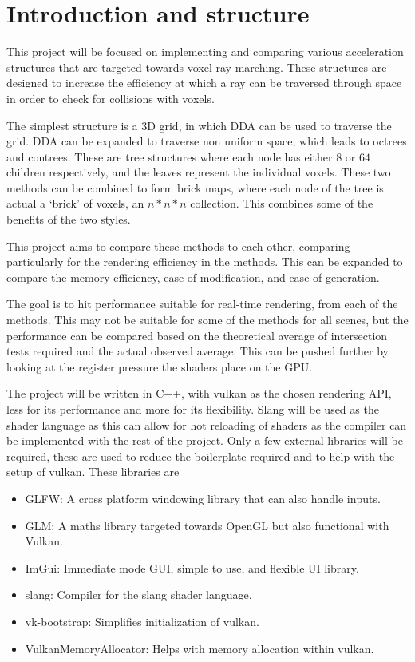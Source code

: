 \section*{Introduction and structure}

This project will be focused on implementing and comparing various
acceleration structures that are targeted towards voxel ray marching.
These structures are designed to increase the efficiency at which a
ray can be traversed through space in order to check for collisions with
voxels.

The simplest structure is a 3D grid, in which DDA can be used to
traverse the grid. DDA can be expanded to traverse non uniform space,
which leads to octrees and contrees. These are tree structures where
each node has either $8$ or $64$ children respectively, and the leaves
represent the individual voxels. These two methods can be combined to
form brick maps, where each node of the tree is actual a `brick' of voxels,
an $n*n*n$ collection. This combines some of the benefits of the two styles.

This project aims to compare these methods to each other, comparing
particularly for the rendering efficiency in the methods. This
can be expanded to compare the memory efficiency, ease of modification,
and ease of generation.

The goal is to hit performance suitable for real-time rendering, from each
of the methods. This may not be suitable for some of the methods for all scenes,
but the performance can be compared based on the theoretical average of
intersection tests required and the actual observed average. This can be
pushed further by looking at the register pressure the shaders place on the GPU.

The project will be written in C++, with vulkan as the chosen rendering API,
less for its performance and more for its flexibility.
Slang will be used as the shader language as this can allow for hot reloading
of shaders as the compiler can be implemented with the rest of the project.
Only a few external libraries will be required, these are used to reduce the
boilerplate required and to help with the setup of vulkan. These libraries
are
\begin{itemize}
  \item GLFW: A cross platform windowing library that can also handle inputs.
  \item GLM: A maths library targeted towards OpenGL but also
    functional with Vulkan.
  \item ImGui: Immediate mode GUI, simple to use, and flexible UI library.
  \item slang: Compiler for the slang shader language.
  \item vk-bootstrap: Simplifies initialization of vulkan.
  \item VulkanMemoryAllocator: Helps with memory allocation within vulkan.
\end{itemize}

